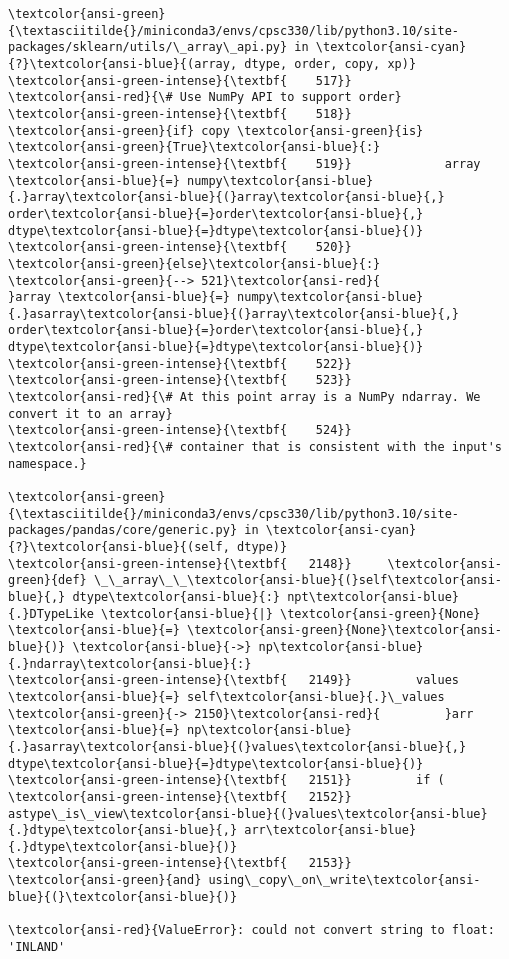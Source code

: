 \documentclass[11pt]{article}
\begin{document}
\begin{Verbatim}[commandchars=\\\{\}, frame=single, framerule=2mm, rulecolor=\color{outerrorbackground}]
\textcolor{ansi-green}{\textasciitilde{}/miniconda3/envs/cpsc330/lib/python3.10/site-packages/sklearn/utils/\_array\_api.py} in \textcolor{ansi-cyan}{?}\textcolor{ansi-blue}{(array, dtype, order, copy, xp)}
\textcolor{ansi-green-intense}{\textbf{    517}}         \textcolor{ansi-red}{\# Use NumPy API to support order}
\textcolor{ansi-green-intense}{\textbf{    518}}         \textcolor{ansi-green}{if} copy \textcolor{ansi-green}{is} \textcolor{ansi-green}{True}\textcolor{ansi-blue}{:}
\textcolor{ansi-green-intense}{\textbf{    519}}             array \textcolor{ansi-blue}{=} numpy\textcolor{ansi-blue}{.}array\textcolor{ansi-blue}{(}array\textcolor{ansi-blue}{,} order\textcolor{ansi-blue}{=}order\textcolor{ansi-blue}{,} dtype\textcolor{ansi-blue}{=}dtype\textcolor{ansi-blue}{)}
\textcolor{ansi-green-intense}{\textbf{    520}}         \textcolor{ansi-green}{else}\textcolor{ansi-blue}{:}
\textcolor{ansi-green}{--> 521}\textcolor{ansi-red}{             }array \textcolor{ansi-blue}{=} numpy\textcolor{ansi-blue}{.}asarray\textcolor{ansi-blue}{(}array\textcolor{ansi-blue}{,} order\textcolor{ansi-blue}{=}order\textcolor{ansi-blue}{,} dtype\textcolor{ansi-blue}{=}dtype\textcolor{ansi-blue}{)}
\textcolor{ansi-green-intense}{\textbf{    522}} 
\textcolor{ansi-green-intense}{\textbf{    523}}         \textcolor{ansi-red}{\# At this point array is a NumPy ndarray. We convert it to an array}
\textcolor{ansi-green-intense}{\textbf{    524}}         \textcolor{ansi-red}{\# container that is consistent with the input's namespace.}

\textcolor{ansi-green}{\textasciitilde{}/miniconda3/envs/cpsc330/lib/python3.10/site-packages/pandas/core/generic.py} in \textcolor{ansi-cyan}{?}\textcolor{ansi-blue}{(self, dtype)}
\textcolor{ansi-green-intense}{\textbf{   2148}}     \textcolor{ansi-green}{def} \_\_array\_\_\textcolor{ansi-blue}{(}self\textcolor{ansi-blue}{,} dtype\textcolor{ansi-blue}{:} npt\textcolor{ansi-blue}{.}DTypeLike \textcolor{ansi-blue}{|} \textcolor{ansi-green}{None} \textcolor{ansi-blue}{=} \textcolor{ansi-green}{None}\textcolor{ansi-blue}{)} \textcolor{ansi-blue}{->} np\textcolor{ansi-blue}{.}ndarray\textcolor{ansi-blue}{:}
\textcolor{ansi-green-intense}{\textbf{   2149}}         values \textcolor{ansi-blue}{=} self\textcolor{ansi-blue}{.}\_values
\textcolor{ansi-green}{-> 2150}\textcolor{ansi-red}{         }arr \textcolor{ansi-blue}{=} np\textcolor{ansi-blue}{.}asarray\textcolor{ansi-blue}{(}values\textcolor{ansi-blue}{,} dtype\textcolor{ansi-blue}{=}dtype\textcolor{ansi-blue}{)}
\textcolor{ansi-green-intense}{\textbf{   2151}}         if (
\textcolor{ansi-green-intense}{\textbf{   2152}}             astype\_is\_view\textcolor{ansi-blue}{(}values\textcolor{ansi-blue}{.}dtype\textcolor{ansi-blue}{,} arr\textcolor{ansi-blue}{.}dtype\textcolor{ansi-blue}{)}
\textcolor{ansi-green-intense}{\textbf{   2153}}             \textcolor{ansi-green}{and} using\_copy\_on\_write\textcolor{ansi-blue}{(}\textcolor{ansi-blue}{)}

\textcolor{ansi-red}{ValueError}: could not convert string to float: 'INLAND'
    \end{Verbatim}
\end{document}
